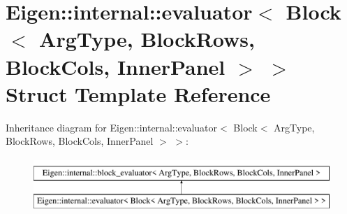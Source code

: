 \hypertarget{struct_eigen_1_1internal_1_1evaluator_3_01_block_3_01_arg_type_00_01_block_rows_00_01_block_cols_00_01_inner_panel_01_4_01_4}{}\section{Eigen\+::internal\+::evaluator$<$ Block$<$ Arg\+Type, Block\+Rows, Block\+Cols, Inner\+Panel $>$ $>$ Struct Template Reference}
\label{struct_eigen_1_1internal_1_1evaluator_3_01_block_3_01_arg_type_00_01_block_rows_00_01_block_cols_00_01_inner_panel_01_4_01_4}
Inheritance diagram for Eigen\+::internal\+::evaluator$<$ Block$<$ Arg\+Type, Block\+Rows, Block\+Cols, Inner\+Panel $>$ $>$\+:\begin{figure}[H]
\begin{center}
\leavevmode
\includegraphics[height=2.000000cm]{struct_eigen_1_1internal_1_1evaluator_3_01_block_3_01_arg_type_00_01_block_rows_00_01_block_cols_00_01_inner_panel_01_4_01_4}
\end{center}
\end{figure}
